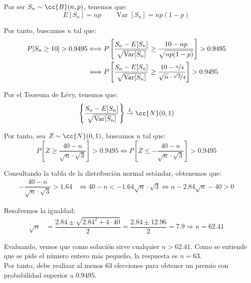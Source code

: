 \documentclass[12pt]{article}
\DeclareMathOperator{\Var}{Var}
\begin{document}
\begin{ejercicio}
        Por ser $S_n\sim \cc{B}(n,p)$, tenemos que:
        \begin{equation*}
            E[S_n] = np\qquad \Var[S_n] = np(1-p)
        \end{equation*}

        Por tanto, buscamos $n$ tal que:
        \begin{align*}
            P[S_n\geq 10] > 0.9495
            &\Longleftrightarrow P\left[\dfrac{S_n-E[S_n]}{\sqrt{\Var[S_n]}}\geq \dfrac{10-np}{\sqrt{np(1-p)}}\right] > 0.9495 \\
            &\Longleftrightarrow P\left[\dfrac{S_n-E[S_n]}{\sqrt{\Var[S_n]}}\geq \dfrac{10-\nicefrac{n}{4}}{\sqrt{n}\cdot \nicefrac{\sqrt{3}}{4}}\right] > 0.9495
        \end{align*}

        Por el Teorema de Lévy, tenemos que:
        \begin{equation*}
            \left\{\dfrac{S_n-E[S_n]}{\sqrt{\Var[S_n]}}\right\}
            \stackrel{L}{\rightarrow} \cc{N}(0,1)
        \end{equation*}

        Por tanto, sea $Z\sim \cc{N}(0,1)$, buscamos $n$ tal que:
        \begin{equation*}
            P[Z\geq \dfrac{40-n}{\sqrt{n}\cdot \sqrt{3}}] > 0.9495
            \Longleftrightarrow
            P[Z\leq -\dfrac{40-n}{\sqrt{n}\cdot \sqrt{3}}] > 0.9495
        \end{equation*}

        Consultando la tabla de la distribución normal estándar, obtenemos que:
        \begin{align*}
            -\dfrac{40-n}{\sqrt{n}\cdot \sqrt{3}}>1.64&\Longleftrightarrow 40-n<-1.64\sqrt{n}\cdot \sqrt{3}
            \Longleftrightarrow n-2.84\sqrt{n}-40>0
        \end{align*}

        Resolvemos la igualdad:
        \begin{align*}
            \sqrt{n} &= \dfrac{2.84\pm \sqrt{2.84^2+4\cdot 40}}{2} = \dfrac{2.84\pm 12.96}{2} = 7.9\Longrightarrow n = 62.41
        \end{align*}

        Evaluando, vemos que como solución sirve cualquier $n>62.41$. Como se entiende que se pide el número entero más pequeño, la respuesta es $n=63$.\\

        Por tanto, debe realizar al menos 63 elecciones para obtener un premio con probabilidad superior a $0.9495$.
    \end{ejercicio}
\end{document}
